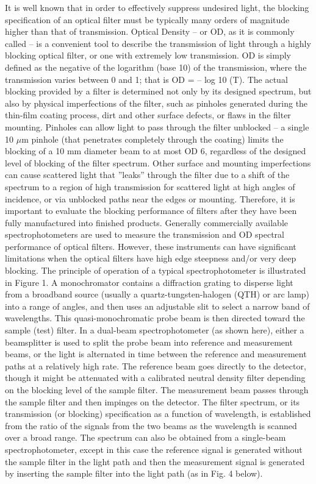 \documentclass{ctuthesis}
\begin{document}
It is well known that in order to effectively suppress undesired light, the 
blocking
specification of an optical filter must be typically many orders of magnitude 
higher than that of
transmission. Optical Density – or OD, as it is commonly called – is a 
convenient tool to
describe the transmission of light through a highly blocking optical filter, or 
one with extremely
low transmission.
OD is simply defined as the negative of the logarithm (base 10) of the
transmission, where the transmission varies between 0 and 1; that is OD = – log 
10 (T).
The actual blocking provided by a filter is determined not only by its designed 
spectrum, but
also by physical imperfections of the filter, such as pinholes generated during 
the thin-film
coating process, dirt and other surface defects, or flaws in the filter 
mounting. Pinholes can
allow light to pass through the filter unblocked – a single 10 $\mu$m pinhole 
(that 
penetrates
completely through the coating) limits the blocking of a 10 mm diameter beam to 
at most OD 6,
regardless of the designed level of blocking of the filter spectrum. Other 
surface and mounting
imperfections can cause scattered light that ''leaks'' through the filter due 
to 
a shift of the
spectrum to a region of high transmission for scattered light at high angles of 
incidence, or via unblocked paths near the edges or mounting. Therefore, it is 
important to evaluate the blocking
performance of filters after they have been fully manufactured into finished 
products.
Generally commercially available spectrophotometers are used to measure the 
transmission
and OD spectral performance of optical filters. However, these instruments can 
have significant
limitations when the optical filters have high edge steepness and/or very deep 
blocking.
The principle of operation of a typical spectrophotometer is illustrated in 
Figure 1.
A
monochromator contains a diffraction grating to disperse light from a broadband 
source (usually
a quartz-tungsten-halogen (QTH) or arc lamp) into a range of angles, and then 
uses an
adjustable slit to select a narrow band of wavelengths. This 
quasi-monochromatic probe beam
is then directed toward the sample (test) filter. In a dual-beam 
spectrophotometer (as shown
here), either a beamsplitter is used to split the probe beam into reference and 
measurement
beams, or the light is alternated in time between the reference and measurement 
paths at a
relatively high rate.
The reference beam goes directly to the detector, though it might be
attenuated with a calibrated neutral density filter depending on the blocking 
level of the sample
filter. The measurement beam passes through the sample filter and then impinges 
on the
detector. The filter spectrum, or its transmission (or blocking) specification 
as a function of
wavelength, is established from the ratio of the signals from the two beams as 
the wavelength is
scanned over a broad range. The spectrum can also be obtained from a single-beam
spectrophotometer, except in this case the reference signal is generated 
without the sample
filter in the light path and then the measurement signal is generated by 
inserting the sample
filter into the light path (as in Fig. 4 below).
\end{document}

